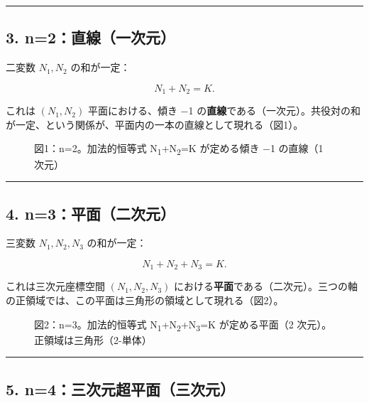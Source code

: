 \documentclass[11pt]{ltjsarticle}
\providecommand{\pandocbounded}[1]{#1}
\begin{document}
\begin{center}\rule{0.5\linewidth}{0.5pt}\end{center}

\subsection{3.
n=2：直線（一次元）}\label{n2ux76f4ux7ddaux4e00ux6b21ux5143}

二変数 \(N_1, N_2\) の和が一定：

\[N_1 + N_2 = K .\]

これは \((N_1, N_2)\) 平面における、傾き −1
の\textbf{直線}である（一次元）。共役対の和が一定、という関係が、平面内の一本の直線として現れる（図1）。

\begin{figure}
\centering
\pandocbounded{}
\caption{図1：n=2。加法的恒等式 N\textsubscript{1}+N\textsubscript{2}=K が定める傾き −1 の直線（1
次元）}
\end{figure}

\begin{center}\rule{0.5\linewidth}{0.5pt}\end{center}

\subsection{4.
n=3：平面（二次元）}\label{n3ux5e73ux9762ux4e8cux6b21ux5143}

三変数 \(N_1, N_2, N_3\) の和が一定：

\[N_1 + N_2 + N_3 = K .\]

これは三次元座標空間 \((N_1, N_2, N_3)\)
における\textbf{平面}である（二次元）。三つの軸の正領域では、この平面は三角形の領域として現れる（図2）。

\begin{figure}
\centering
\pandocbounded{}
\caption{図2：n=3。加法的恒等式 N\textsubscript{1}+N\textsubscript{2}+N\textsubscript{3}=K が定める平面（2
次元）。正領域は三角形（2-単体）}
\end{figure}

\begin{center}\rule{0.5\linewidth}{0.5pt}\end{center}

\subsection{5.
n=4：三次元超平面（三次元）}\label{n4ux4e09ux6b21ux5143ux8d85ux5e73ux9762ux4e09ux6b21ux5143}
\end{document}
